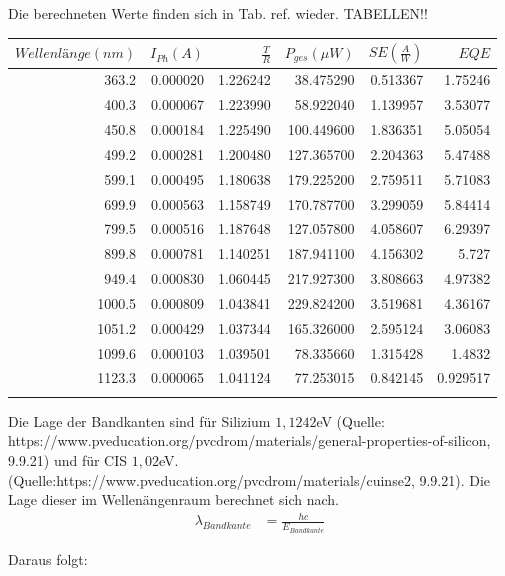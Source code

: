 Die berechneten Werte finden sich in Tab. ref. wieder. TABELLEN!!
\\

\begin{tabular}{rrrrrr}
    $Wellenlänge (nm)$ &  $I_{Ph} (A)$ &    $\frac{T}{R}$ &  $P_{ges} (\mu W)$ &  $SE (\frac{A}{W})$ &       $EQE$ \\
    \hline
    363.2 &  0.000020 &  1.226242 &   38.475290 &  0.513367 &   1.75246 \\
    400.3 &  0.000067 &  1.223990 &   58.922040 &  1.139957 &   3.53077 \\
    450.8 &  0.000184 &  1.225490 &  100.449600 &  1.836351 &   5.05054 \\
    499.2 &  0.000281 &  1.200480 &  127.365700 &  2.204363 &   5.47488 \\
    599.1 &  0.000495 &  1.180638 &  179.225200 &  2.759511 &   5.71083 \\
    699.9 &  0.000563 &  1.158749 &  170.787700 &  3.299059 &   5.84414 \\
    799.5 &  0.000516 &  1.187648 &  127.057800 &  4.058607 &   6.29397 \\
    899.8 &  0.000781 &  1.140251 &  187.941100 &  4.156302 &     5.727 \\
    949.4 &  0.000830 &  1.060445 &  217.927300 &  3.808663 &   4.97382 \\
    1000.5 &  0.000809 &  1.043841 &  229.824200 &  3.519681 &   4.36167 \\
    1051.2 &  0.000429 &  1.037344 &  165.326000 &  2.595124 &   3.06083 \\
    1099.6 &  0.000103 &  1.039501 &   78.335660 &  1.315428 &    1.4832 \\
    1123.3 &  0.000065 &  1.041124 &   77.253015 &  0.842145 &  0.929517 \\
    \label{tab:32mono}
\end{tabular}

Die Lage der Bandkanten sind für Silizium $1,1242$eV (Quelle: https://www.pveducation.org/pvcdrom/materials/general-properties-of-silicon, 9.9.21) und für CIS $1,02$eV. (Quelle:https://www.pveducation.org/pvcdrom/materials/cuinse2, 9.9.21). Die Lage dieser im Wellenängenraum berechnet sich nach. \\

\begin{align}
\lambda_{Bandkante} &= \frac{hc}{E_{Bandkante}}
\end{align}

Daraus folgt: \\

